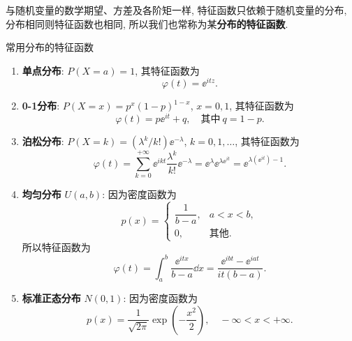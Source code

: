 与随机变量的数学期望、方差及各阶矩一样,
特征函数只依赖于随机变量的分布,
分布相同则特征函数也相同,
所以我们也常称为某\textbf{分布的特征函数}.


\begin{example}\label{exam:4.1.1}
    常用分布的特征函数
    \begin{enumerate}
        \item
        \textbf{单点分布}: $ P (X = a) = 1 $, 
        其特征函数为
        \begin{equation*}
            \varphi (t) = \ee^{itz}.
        \end{equation*}
        \item\label{exam:4.1.1.2}
        \textbf{0-1分布}: $ P( X = x ) = p^x  ( 1 - p )^{1 - x} $, $ x = 0,1 $,
        其特征函数为
        \begin{equation*}
            \varphi (t) = p \ee^{it} + q, \quad \text{其中} \ q= 1 - p.
        \end{equation*}
        \item
        \textbf{泊松分布}: $ P ( X = k ) = ( \lambda^k/k! ) \ee^{-\lambda} $, $ k = 0, 1, \dotsc $, 其特征函数为
        \begin{equation*}
            \varphi (t) = \sum_{k=0}^{+\infty} \ee^{ikt} \frac{\lambda^k}{k!} \ee^{-\lambda} = \ee^{\lambda} \ee^{\lambda \ee^{it}} = \ee^{\lambda ( \ee^{it} ) -1}.
        \end{equation*}
        \item
        \textbf{均匀分布} $ U ( a,b ) $: 因为密度函数为
        \begin{equation*}
            p (x) = 
            \begin{cases}
                \dfrac{1}{b-a}, & a < x < b,\\
                0, & \text{其他}.
            \end{cases}
        \end{equation*}
        所以特征函数为
        \begin{equation*}
            \varphi (t) = \int_a^b \frac{\ee^{itx}}{b - a} \dd x = \frac{\ee^{ibt} - \ee^{iat}}{it (b-a)}.
        \end{equation*}
        \item
        \textbf{标准正态分布} $ N (0,1) $: 因为密度函数为
        \begin{equation*}
            p (x) = \frac{1}{\sqrt{2\pi}} \exp \left( -\frac{x^2}{2} \right), \quad - \infty < x < + \infty.

\end{equation*}
\end{enumerate}
\end{example}
